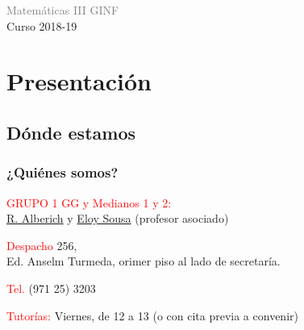 \documentclass[12pt,t]{beamer}
\title[\red{Matemáticas III GINF}]{}
\author[]{Ricardo Alberich}
\date{}
\newcommand{\red}[1]{\textcolor{red}{#1}}
\newcommand{\blue}[1]{\textcolor{blue}{#1}}
\newcommand{\gray}[1]{\textcolor{gray}{#1}}
\theoremstyle{plain}
\theoremstyle{definition}
\begin{document}
\beamertemplatedotitem


\lstset{breaklines=true}
\lstset{basicstyle=\ttfamily}


\begin{frame}
\vfill
\begin{center}
\gray{\Huge Matemáticas III GINF}\\[3ex]
\Large Curso 2018-19\\[3ex]
\end{center}
\vfill
\end{frame}


\section{Presentación}

\subsection{Dónde estamos}
\begin{frame}
\frametitle{¿Quiénes somos?}
\vspace*{-0.2cm}


\red{GRUPO 1 GG y Medianos 1 y 2:}\\ \href{https://www.uib.es/es/personal/ABDI0ODk/}{R. Alberich} y \href{https://www.uib.es/es/personal/ABjI5MTE5Mw/}{Eloy Sousa} (profesor asociado)\medskip

% 

\red{Despacho} 256,\\
 Ed. Anselm Turmeda, orimer piso al lado de secretaría.
\medskip

\red{Tel.} (971 25) 3203
\medskip

\red{Tutorías:} Viernes, de 12 a 13 (o con cita previa a convenir)
\vspace*{\fill}

\




\end{frame}
\end{document}
